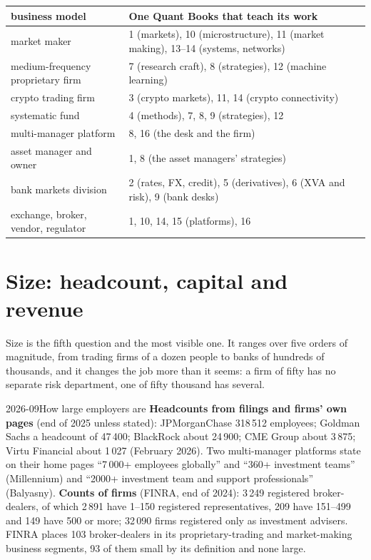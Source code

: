 \begin{center}\small
\begin{tabular}{@{}lp{7.2cm}@{}}
\toprule
business model & One Quant Books that teach its work\\
\midrule
market maker & 1 (markets), 10 (microstructure), 11 (market making), 13--14 (systems, networks)\\
medium-frequency proprietary firm & 7 (research craft), 8 (strategies), 12 (machine learning)\\
crypto trading firm & 3 (crypto markets), 11, 14 (crypto connectivity)\\
systematic fund & 4 (methods), 7, 8, 9 (strategies), 12\\
multi-manager platform & 8, 16 (the desk and the firm)\\
asset manager and owner & 1, 8 (the asset managers' strategies)\\
bank markets division & 2 (rates, FX, credit), 5 (derivatives), 6 (XVA and risk), 9 (bank desks)\\
exchange, broker, vendor, regulator & 1, 10, 14, 15 (platforms), 16\\
\bottomrule
\end{tabular}
\end{center}

\section{Size: headcount, capital and revenue}

Size is the fifth question and the most visible one. It ranges over five orders of magnitude, from trading firms of a
dozen people to banks of hundreds of thousands, and it changes the job more than it seems: a firm of fifty has no
separate risk department, one of fifty thousand has several.

\begin{dated}{2026-09}{How large employers are}\label{dat:in:a-map-of-the-industry:sizes}
\textbf{Headcounts from filings and firms' own pages} (end of 2025 unless stated): JPMorganChase 318\,512 employees;
Goldman Sachs a headcount of 47\,400; BlackRock about 24\,900; CME Group about 3\,875; Virtu Financial about 1\,027
(February 2026). Two multi-manager platforms state on their home pages ``7\,000+ employees globally'' and ``360+
investment teams'' (Millennium) and ``2000+ investment team and support professionals'' (Balyasny).
\textbf{Counts of firms} (FINRA, end of 2024): 3\,249 registered broker-dealers, of which 2\,891 have 1--150 registered
representatives, 209 have 151--499 and 149 have 500 or more; 32\,090 firms registered only as investment advisers.
FINRA places 103 broker-dealers in its proprietary-trading and market-making business segments, 93 of them small by
its definition and none large.
\end{dated}

